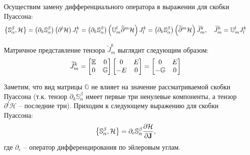 \documentclass[12pt]{article}
\newcommand{\bbU}{\mathbb{U}}
\newcommand{\bbG}{\mathbb{G}}
\newcommand{\bbE}{\mathbb{E}}
\newcommand{\bbS}{\mathbb{S}}
\newcommand{\bfJ}{\mathbf{J}}
\newcommand{\mH}{\mathcal{H}}
\newcommand{\lb}{\left(}
\newcommand{\rb}{\right)}
\newcommand{\lcb}{\left\{}
\newcommand{\rcb}{\right\}}
\begin{document}
Осуществим замену дифференциального оператора в выражении для скобки Пуассона:
\begin{gather}
	\lcb \bbS^\beta_\alpha , \mH \rcb = \lb \partial_k \bbS^\beta_\alpha \rb \lb \partial^l \mH \rb J^k_l = \lb \partial_k \bbS^\beta_\alpha \rb \lb \bbU^l_m \widetilde{\partial}^m \mH \rb J^k_l = \lb \partial_k \bbS^\beta_\alpha \rb \lb \widetilde{\partial}^m \mH \rb \widetilde{J}^k_m, \quad \widetilde{J}^k_m = \bbU^l_m J^k_l \notag 
\end{gather}

Матричное представление тензора $\widetilde{J}_m^k$ выглядит следующим образом:
\begin{gather}
	\widetilde{J}_m^k = 
	\begin{bmatrix}
		\bbE & 0 \\
		0 & \bbG
	\end{bmatrix}
	\begin{bmatrix}
		0 & E \\
		-E & 0
	\end{bmatrix} = 
	\begin{bmatrix}
		0 & E \\
		-\bbG & 0
	\end{bmatrix} \notag
\end{gather}

Заметим, что вид матрицы $\bbG$ не влияет на значение рассматриваемой скобки Пуассона (т.к. тензор $\partial_k \bbS^\beta_\alpha$ имеет первые три ненулевые компоненты, а тензор $\partial^l \mH$ -- последние три). Приходим к следующему выражению для скобки Пуассона:
\begin{gather}
	\lcb \bbS_\alpha^\beta, \mH \rcb = \partial_e \bbS_\alpha^\beta \frac{\partial \mH}{\partial \bfJ}, \notag
\end{gather}
где $\partial_e$ -- оператор дифференцирования по эйлеровым углам.
\end{document}
